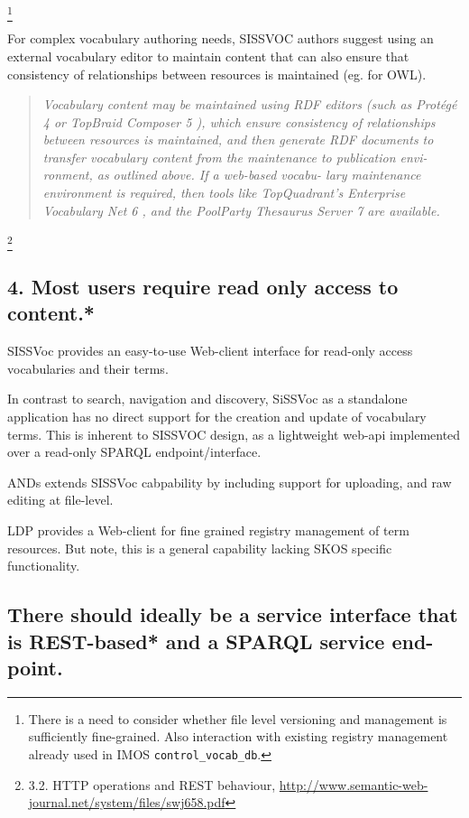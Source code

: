 \documentclass[10pt,a4paper]{article}
\newenvironment{italicquotes}
{\begin{quote}\itshape}
{\end{quote}}
\begin{document}
\begin{flushleft}
  \footnote {
    There is a need to consider whether file level versioning and management is
  sufficiently fine-grained. Also interaction with existing registry management
  already used in IMOS \texttt{control\_vocab\_db}. 
  }
  
  For complex vocabulary authoring needs, SISSVOC authors suggest using an
external vocabulary editor to maintain content that can also ensure that consistency of
relationships between resources is maintained (eg. for OWL). 

  \begin{italicquotes} 
  Vocabulary content may be maintained using RDF editors (such as Protégé 4 or
TopBraid Composer 5 ), which ensure consistency of
relationships between resources is maintained, and
then generate RDF documents to transfer vocabulary
content from the maintenance to publication envi-
ronment, as outlined above. If a web-based vocabu-
lary maintenance environment is required, then tools
like TopQuadrant’s Enterprise Vocabulary Net 6 , and
the PoolParty Thesaurus Server 7 are available.
  \end{italicquotes} 

  \footnote {
    3.2. HTTP operations and REST behaviour, 
\url{http://www.semantic-web-journal.net/system/files/swj658.pdf} 
  }


\subsection{ 
  4. Most users require read only access to content.* 
}
  SISSVoc provides an easy-to-use Web-client interface for read-only access vocabularies and their terms.

  In contrast to search, navigation and discovery, SiSSVoc as a standalone application has no direct 
  support for the creation and update of vocabulary terms. This is inherent to SISSVOC design, as a 
  lightweight web-api implemented over a read-only SPARQL endpoint/interface.  

  ANDs extends SISSVoc cabpability by including support for uploading, and raw editing
  at file-level. 

  LDP provides a Web-client for fine grained registry management of term
resources. But note, this is a general capability lacking SKOS specific functionality.


\subsection{ 
  There should ideally be a service interface that is REST-based* and a SPARQL service end-point.
}


\end{flushleft}
\end{document}
